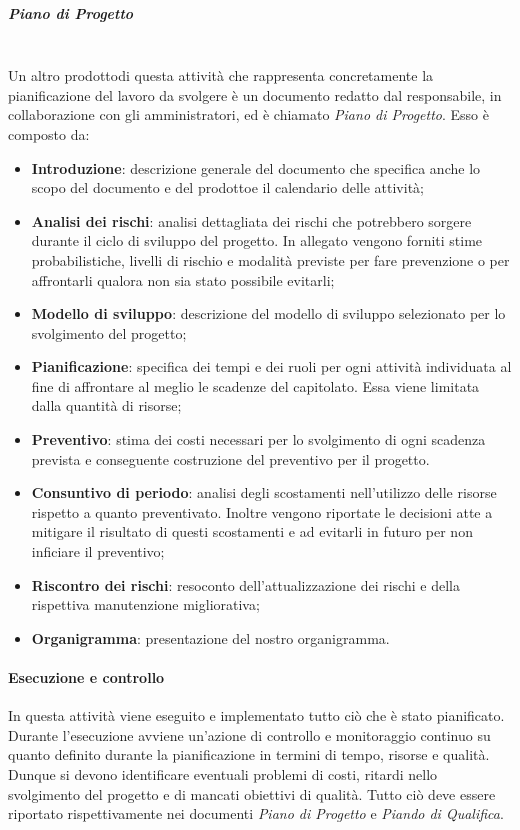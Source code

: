 				\subparagraph*{Piano di Progetto}\mbox{}\\ [1mm]
				Un altro prodotto\glosp di questa attività che rappresenta concretamente la pianificazione del lavoro da svolgere è un documento redatto dal responsabile, in collaborazione con gli amministratori, ed è chiamato \textit{Piano di Progetto}. Esso è composto da:
				\begin{itemize}
					\item \textbf{Introduzione}: descrizione generale del documento che specifica anche lo scopo del documento e del prodotto\glosp e il calendario delle attività;
					\item \textbf{Analisi dei rischi}: analisi dettagliata dei rischi che potrebbero sorgere durante il ciclo di sviluppo del progetto\glo. In allegato vengono forniti stime probabilistiche, livelli di rischio e modalità previste per fare prevenzione o per affrontarli qualora non sia stato possibile evitarli;
					\item \textbf{Modello di sviluppo}: descrizione del modello di sviluppo selezionato per lo svolgimento del progetto\glo;
					\item \textbf{Pianificazione}: specifica dei tempi e dei ruoli per ogni attività individuata al fine di affrontare al meglio le scadenze del capitolato\glo. Essa viene limitata dalla quantità di risorse;
					\item \textbf{Preventivo}: stima dei costi necessari per lo svolgimento di ogni scadenza prevista e conseguente costruzione del preventivo per il progetto\glo.
					\item \textbf{Consuntivo di periodo}: analisi degli scostamenti nell'utilizzo delle risorse rispetto a quanto preventivato. Inoltre vengono riportate le decisioni atte a mitigare il risultato di questi scostamenti e ad evitarli in futuro per non inficiare il preventivo;
					\item \textbf{Riscontro dei rischi}: resoconto dell'attualizzazione dei rischi e della rispettiva manutenzione migliorativa;
					\item \textbf{Organigramma}: presentazione del nostro organigramma.
				\end{itemize}			
			\paragraph{Esecuzione e controllo}
				In questa attività viene eseguito e implementato tutto ciò che è stato pianificato.
				Durante l'esecuzione avviene un'azione di controllo e monitoraggio continuo su quanto definito durante la pianificazione in termini di tempo, risorse e qualità. Dunque si devono identificare eventuali problemi di costi, ritardi nello svolgimento del progetto e di mancati obiettivi di qualità. Tutto ciò deve essere riportato rispettivamente nei documenti \textit{Piano di Progetto} e \textit{Piando di Qualifica}.
